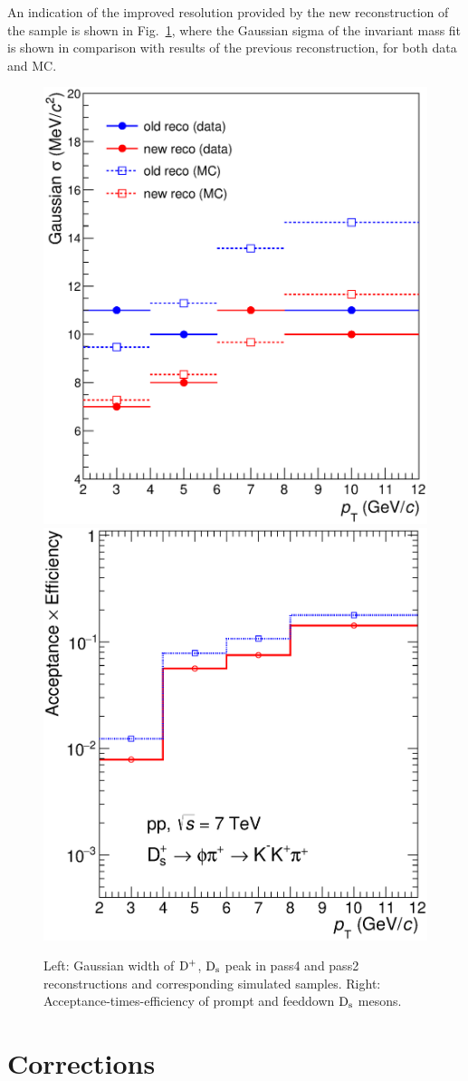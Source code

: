 An indication of the improved resolution provided by the new 
reconstruction of the sample is shown in Fig.~\ref{fig:sigma4vs2}, where the 
Gaussian sigma of the invariant mass fit is shown in comparison with 
results of the previous reconstruction, for both data and MC. 
\begin{figure}[!hb]
\begin{center}
\includegraphics[width=.48\textwidth]{FigCap4/Resolutions_pass2_pass4.eps}
\includegraphics[width=.48\textwidth]{FigCap4/AccEff_Ds_Pass4.eps}
\caption{Left: Gaussian width of ${\rm D^+}$, ${\rm D_s}$ peak in pass4 and pass2 reconstructions and
corresponding simulated samples. Right: Acceptance-times-efficiency of prompt and feeddown ${\rm D_s}$ mesons.}
\label{fig:sigma4vs2}
\end{center}
\end{figure}

\section{Corrections}

